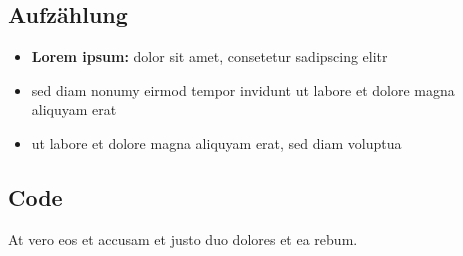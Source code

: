 \subsection{Aufzählung}

\begin{itemize}
	\item \textbf{Lorem ipsum:} dolor sit amet, consetetur sadipscing elitr
	\item sed diam nonumy eirmod tempor invidunt ut labore et dolore magna aliquyam erat
	\item ut labore et dolore magna aliquyam erat, sed diam voluptua
\end{itemize}

\subsection{Code}

At vero eos et accusam et justo duo dolores et ea rebum.

\begin{lstlisting}[style=Java, caption=Implizite Transaktion]

\end{lstlisting}

